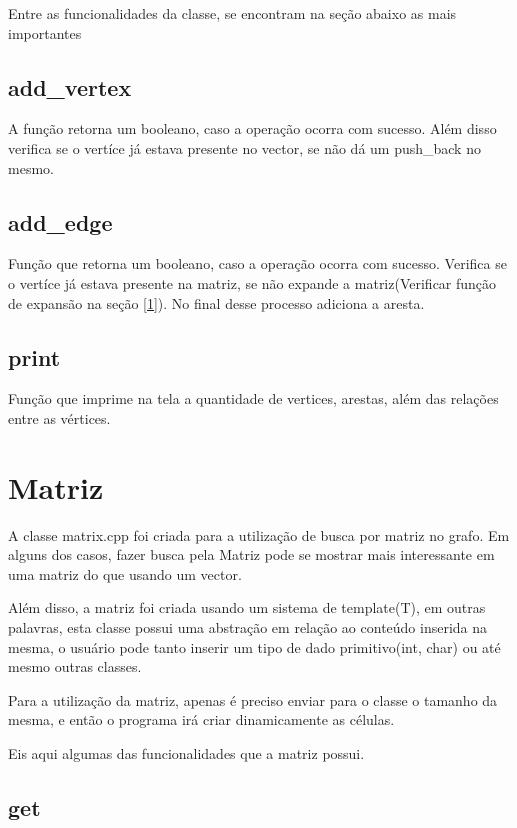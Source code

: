 \documentclass[12pt]{article}
\begin{document}
  Entre as funcionalidades da classe, se encontram na seção abaixo as mais importantes

  \subsection{add\_vertex}
  
  A função retorna um booleano, caso a operação ocorra com sucesso. Além disso verifica se o vertíce 
  já estava presente no vector, se não dá um push\_back no mesmo.

  \subsection{add\_edge}

  Função que retorna um booleano, caso a operação ocorra com sucesso. Verifica se o vertíce
  já estava presente na matriz, se não expande a matriz(Verificar função de expansão na seção [\ref{sec:matriz}]).
  No final desse processo adiciona a aresta.  

  \subsection{print}

  Função que imprime na tela a quantidade de vertices, arestas, além das relações entre as vértices.

  \section{Matriz} \label{sec:matriz}

  A classe matrix.cpp foi criada para a utilização de busca por matriz no
  grafo. Em alguns dos casos, fazer busca pela Matriz pode se mostrar mais 
  interessante em uma matriz do que usando um vector.

  Além disso, a matriz foi criada usando um sistema de template(T), em outras
  palavras, esta classe possui uma abstração em relação ao conteúdo inserida
  na mesma, o usuário pode tanto inserir um tipo de dado primitivo(int, char) ou até
  mesmo outras classes.

  Para a utilização da matriz, apenas é preciso enviar para o classe o 
  tamanho da mesma, e então o programa irá criar dinamicamente as células.

  Eis aqui algumas das funcionalidades que a matriz possui.

  \subsection{get}
\end{document}
